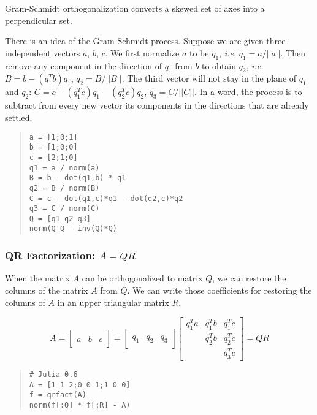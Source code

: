  Gram-Schmidt orthogonalization converts a skewed set of axes into a perpendicular set.

 There is an idea of the Gram-Schmidt process. Suppose we are given three independent vectors $a$, $b$, $c$. We first normalize
 $a$ to be $q_1$, {\it i.e.} $q_1 = a / ||a||$. Then remove any component in the direction of $q_1$ from $b$
 to obtain $q_2$, {\it i.e.} $B = b - (q_1^T b)q_1$, $q_2 = B / ||B||$. The third
 vector will not stay in the plane of $q_1$ and $q_2$: $C = c - (q_1^T c)q_1 - (q_2^T c)q_2$,
 $q_3 = C / ||C||$. In a word, the process is to subtract from every new
 vector its components in the directions that are already settled.

\begin{quote}\begin{lstlisting}
a = [1;0;1]
b = [1;0;0]
c = [2;1;0]
q1 = a / norm(a)
B = b - dot(q1,b) * q1
q2 = B / norm(B)
C = c - dot(q1,c)*q1 - dot(q2,c)*q2
q3 = C / norm(C)
Q = [q1 q2 q3]
norm(Q'Q - inv(Q)*Q)
\end{lstlisting}\end{quote}

\subsubsection{QR Factorization: $A=QR$}

 When the matrix $A$ can be orthogonalized to matrix $Q$, we can restore
 the columns of the matrix $A$ from $Q$. We can write those coefficients
 for restoring the columns of $A$ in an upper triangular matrix $R$.

 $$A = \begin{bmatrix} & & \\ a&b&c \\ & & \end{bmatrix}
	 = \begin{bmatrix} & & \\ q_1&q_2&q_3 \\ & & \end{bmatrix}
		 \begin{bmatrix} q_1^Ta & q_1^Tb & q_1^T c \\ & q_2^T b & q_2^Tc \\ & & q_3^Tc \end{bmatrix}
	 = QR $$

\begin{quote}\begin{lstlisting}
# Julia 0.6
A = [1 1 2;0 0 1;1 0 0]
f = qrfact(A)
norm(f[:Q] * f[:R] - A)
\end{lstlisting}\end{quote}

